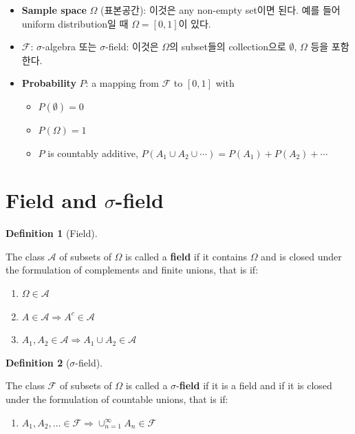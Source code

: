 \documentclass[
  letterpaper,
  DIV=11,
  numbers=noendperiod]{scrreprt}
\providecommand{\tightlist}{%
  \setlength{\itemsep}{0pt}\setlength{\parskip}{0pt}}\usepackage{longtable,booktabs,array}
\theoremstyle{plain}
\theoremstyle{definition}
\theoremstyle{definition}
\newtheorem{definition}{Definition}[chapter]
\theoremstyle{plain}
\theoremstyle{plain}
\theoremstyle{remark}
\begin{document}
\begin{itemize}
\item
  \textbf{Sample space} \(\Omega\) (표본공간): 이것은 any non-empty
  set이면 된다. 예를 들어 uniform distribution일 때 \(\Omega = [0,1]\)이
  있다.
\item
  \(\mathcal{F}\): \(\sigma\)-algebra 또는 \(\sigma\)-field: 이것은
  \(\Omega\)의 subset들의 collection으로 \(\emptyset\), \(\Omega\) 등을
  포함한다.
\item
  \textbf{Probability} \(P\): a mapping from \(\mathcal{F}\) to
  \([0,1]\) with

  \begin{itemize}
  \tightlist
  \item
    \(P(\emptyset)=0\)
  \item
    \(P(\Omega)=1\)
  \item
    \(P\) is countably additive,
    \(P(A_1 \cup A_2 \cup \cdots) = P(A_1) + P(A_2) + \cdots\)
  \end{itemize}
\end{itemize}

\section{\texorpdfstring{Field and
\(\sigma\)-field}{Field and \textbackslash sigma-field}}\label{field-and-sigma-field}

\begin{definition}[Field]\protect\hypertarget{def-field}{}\label{def-field}

The class \(\mathcal{A}\) of subsets of \(\Omega\) is called a
\textbf{field} if it contains \(\Omega\) and is closed under the
formulation of complements and finite unions, that is if:

\begin{enumerate}
\def\labelenumi{\arabic{enumi}.}
\item
  \(\Omega \in \mathcal{A}\)
\item
  \(A\in\mathcal{A} \Longrightarrow A^c \in \mathcal{A}\)
\item
  \(A_1, A_2 \in \mathcal{A} \Longrightarrow A_1 \cup A_2 \in \mathcal{A}\)
\end{enumerate}

\end{definition}

\begin{definition}[\(\sigma\)-field]\protect\hypertarget{def-sigmafield}{}\label{def-sigmafield}

The class \(\mathcal{F}\) of subsets of \(\Omega\) is called a
\(\sigma\)-\textbf{field} if it is a field and if it is closed under the
formulation of countable unions, that is if:

\begin{enumerate}
\def\labelenumi{\arabic{enumi}.}
\setcounter{enumi}{3}
\tightlist
\item
  \(A_1, A_2, \ldots \in \mathcal{F} \Longrightarrow \cup_{n=1}^{\infty} A_n \in \mathcal{F}\)
\end{enumerate}

\end{definition}
\end{document}
